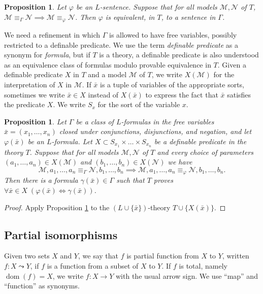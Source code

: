 \documentclass{amsart}
\newcommand{\ca}{\mathcal}
\newcommand{\dom}{\operatorname{dom}}
\theoremstyle{plain}
\newtheorem{prop}[thm]{Proposition}
\theoremstyle{definition}
\newcommand{\pto}{\leadsto} %
\begin{document}
\begin{prop}\label{prop:separation}
Let $\varphi$ be an $L$-sentence. Suppose that for all models $\ca M, \ca N$ of $T$, $\ca M \equiv_{\Gamma} \ca N\implies \ca M \equiv_\varphi \ca N$. Then $\varphi$ is equivalent, in $T$, to a sentence in $\Gamma$. 
\end{prop}
We need a refinement in which $\Gamma$ is allowed to have free variables, possibly restricted to a definable predicate. We use the term {\em definable predicate} as a synonym for {\em formula}, but if $T$ is a theory, a definable predicate is also understood as an equivalence class of formulas modulo provable equivalence in $T$. Given a definable predicate $X$ in $T$ and a model $\ca M$ of $T$, we write $X(\ca M)$ for the interpretation of $X$ in $\ca M$. If $\bar { x}$ is a tuple of variables of the appropriate sorts, sometimes we write $\bar { x} \in X$ instead of $X(\bar { x})$ to express the fact that $\bar { x}$ satisfies the predicate $X$.  We write $S_x$ for the sort of the variable $x$. 

\begin{prop} \label{prop:EQ} Let $\Gamma$ be a class of $L$-formulas in the free variables $\bar {x} = (x_1,\ldots, x_n)$ closed under conjunctions, disjunctions, and negation, and let $\varphi(\bar {x})$ be an $L$-formula. Let $X \subset S_{x_1}\times \ldots \times S_{x_n}$ be a definable predicate in the theory $T$. 
Suppose that for all models  $\ca M, \ca N$ of $T$ and every choice of parameters $(a_1, \ldots, a_n) \in X(\ca M)$ and $(b_1, \ldots, b_n) \in X(\ca N)$ we have
%
$$\ca M, a_1, \ldots, a_n \equiv_\Gamma \ca N, b_1, \ldots, b_n \implies \ca M, a_1, \ldots, a_n \equiv_\varphi \ca N, b_1, \ldots, b_n.$$
%
Then there is a formula $\gamma(\bar {x}) \in \Gamma$ such that $T$ proves $\forall \bar {x} \in X \; (\varphi(\bar {x}) \iff \gamma (\bar {x}))$. 
\end{prop}
\begin{proof}
Apply Proposition \ref{prop:separation} to the $(L\cup \{\bar {x}\})$-theory $T \cup \{X(\bar {x})\}$. 
\end{proof}


\subsection{Partial isomorphisms}
Given two sets $X$ and $Y$, we say that $f$ is partial function from $X$ to $Y$, written $f:X\pto Y$, if $f$ is a function from a subset of $X$ to $Y$. If $f$ is total, namely $\dom(f) = X$, we write $f:X\to Y$ with the usual arrow sign.  
We use ``map'' and ``function'' as synonyms.  
\end{document}
